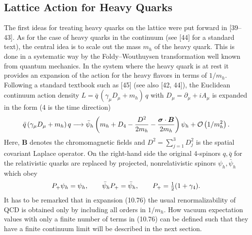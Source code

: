 \subsection{Lattice Action for Heavy Quarks}

The first ideas for treating heavy quarks on the lattice were put forward in
[39--43]. As for the case of heavy quarks in the continuum (see [44] for a
standard text), the central idea is to scale out the mass $m_h$ of the heavy
quark. This is done in a systematic way by the Foldy--Wouthuysen
transformation well known from quantum mechanics. In the system where the
heavy quark is at rest it provides an expansion of the action for the heavy
flavors in terms of $1/m_h$. Following a standard textbook such as [45] (see
also [42, 44]), the Euclidean continuum action density $L = \bar q\,(\gamma_\mu
D_\mu + m_h)\,q$ with $D_\mu = \partial_\mu + iA_\mu$ is expanded in the form
(4 is the time direction)
\begin{equation}
  \bar q\,(\gamma_\mu D_\mu + m_h)\,q
  \longrightarrow \bar\psi_h\left(m_h + D_4
  - \frac{D^2}{2m_h} - \frac{\boldsymbol{\sigma}\cdot\boldsymbol{B}}{2m_h}
  \right)\psi_h + \mathcal{O}\left(1/m_h^2\right) .
\end{equation}
Here, $\boldsymbol{B}$ denotes the chromomagnetic fields and
$D^2 = \sum_{j=1}^{3}D_j^2$ is the spatial covariant Laplace operator. On the
right-hand side the original 4-spinors $q, \bar q$ for the relativistic quarks
are replaced by projected, nonrelativistic spinors $\psi_h, \bar\psi_h$ which
obey
\begin{equation}
  P_+\psi_h = \psi_h , \qquad \bar\psi_h P_+ = \bar\psi_h , \qquad
  P_+ = \tfrac{1}{2}(1 + \gamma_4) .
\end{equation}
It has to be remarked that in expansion (10.76) the usual renormalizability of
QCD is obtained only by including all orders in $1/m_h$. How vacuum
expectation values with only a finite number of terms in (10.76) can be
defined such that they have a finite continuum limit will be described in the
next section.

